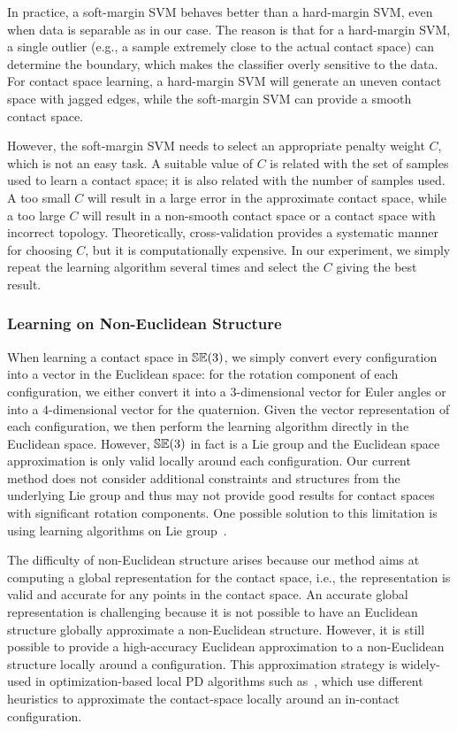 In practice, a soft-margin SVM behaves better than a hard-margin SVM, even when data is separable as in our case. The reason is that for a hard-margin SVM, a single outlier (e.g., a sample extremely close to the actual contact space) can determine the boundary, which makes the classifier overly sensitive to the data. For contact space learning, a hard-margin SVM will generate an uneven contact space with jagged edges, while the soft-margin SVM can provide a smooth contact space. 

However, the soft-margin SVM needs to select an appropriate penalty weight $C$, which is not an easy task. A suitable value of $C$ is related with the set of samples used to learn a contact space; it is also related with the number of samples used. A too small $C$ will result in a large error in the approximate contact space, while a too large $C$ will result in a non-smooth contact space or a contact space with incorrect topology. Theoretically, cross-validation provides a systematic manner for choosing $C$, but it is computationally expensive. In our experiment, we simply repeat the learning algorithm several times and select the $C$ giving the best result.

\subsubsection{Learning on Non-Euclidean Structure}
When learning a contact space in $\mathbb {SE}(3)$, we simply convert every configuration into a vector in the Euclidean space: for the rotation component of each configuration, we either convert it into a $3$-dimensional vector for Euler angles or into a $4$-dimensional vector for the quaternion. Given the vector representation of each configuration, we then perform the learning algorithm directly in the Euclidean space. However, $\mathbb {SE}(3)$ in fact is a Lie group and the Euclidean space approximation is only valid locally around each configuration. Our current method does not consider additional constraints and structures from the underlying Lie group and thus may not provide good results for contact spaces with significant rotation components. One possible solution to this limitation is using learning algorithms on Lie group~\cite{Tuzel:2008:LLG}.

The difficulty of non-Euclidean structure arises because our method aims at computing a global representation for the contact space, i.e., the representation is valid and accurate for any points in the contact space. An accurate global representation is challenging because it is not possible to have an Euclidean structure globally approximate a non-Euclidean structure. However, it is still possible to provide a high-accuracy Euclidean approximation to a non-Euclidean structure locally around a configuration. This approximation strategy is widely-used in optimization-based local PD algorithms such as~\cite{Nawratil:2009:GPD,Zhang:2007:AFP,Je:2012:PRP,Tang:IGP:2013}, which use different heuristics to approximate the contact-space locally around an in-contact configuration.



